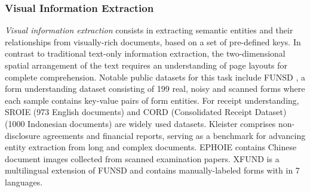 \subsubsection{Visual Information Extraction}

\textit{Visual information extraction} consists in extracting semantic entities and their relationships from visually-rich documents, based on a set of pre-defined keys. In contrast to traditional text-only information extraction, the two-dimensional spatial arrangement of the text requires an understanding of page layouts for complete comprehension. Notable public datasets for this task include \ac{FUNSD} \citep{jaume2019funsd}, a form understanding dataset consisting of 199 real, noisy and scanned forms where each sample contains key-value pairs of form entities. For receipt understanding, \ac{SROIE} \citep{huang2019icdar2019} (973 English documents) and \ac{CORD} (Consolidated Receipt Dataset) \citep{park2019cord} (1000 Indonesian documents) are widely used datasets. Kleister \citep{gralinski2020kleister} comprises non-disclosure agreements and financial reports, serving as a benchmark for advancing entity extraction from long and complex documents. EPHOIE \citep{wang2021towards} contains Chinese document images collected from scanned examination papers. XFUND is a multilingual extension of \ac{FUNSD} \citep{xu-etal-2022-xfund} and contains manually-labeled forms with in 7 languages.




